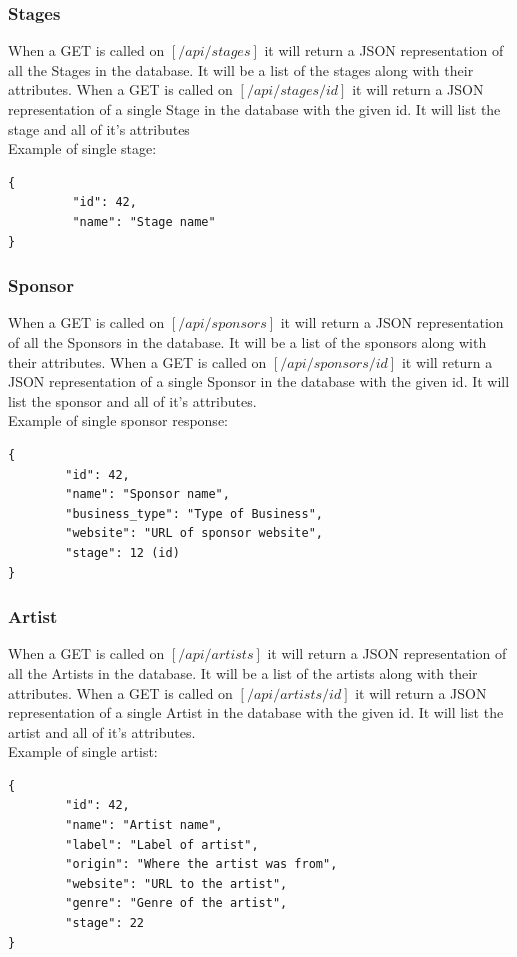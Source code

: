 \documentclass[12pt,english]{scrartcl}
\begin{document}
\subsubsection{Stages}

When a GET is called on $[/api/stages]$ it will return a JSON representation of all the Stages in the database.  It will be a list of the stages along with their attributes.
When a GET is called on $[/api/stages/{id}]$ it will return a JSON representation of a single Stage in the database with the given id.  It will list the stage and all of it's attributes
\\
Example of single stage:
\begin{verbatim}
{
         "id": 42,
         "name": "Stage name"
}
\end{verbatim}
\subsubsection{Sponsor}

When a GET is called on $[/api/sponsors]$ it will return a JSON representation of all the Sponsors in the database.  It will be a list of the sponsors along with their attributes.
When a GET is called on $[/api/sponsors/{id}]$ it will return a JSON representation of a single Sponsor in the database with the given id.  It will list the sponsor and all of it's attributes.
\\
Example of single sponsor response:
\begin{verbatim}
{
        "id": 42,
        "name": "Sponsor name",
        "business_type": "Type of Business",
        "website": "URL of sponsor website",
        "stage": 12 (id)
}
\end{verbatim}

\subsubsection{Artist}

When a GET is called on $[/api/artists]$ it will return a JSON representation of all the Artists in the database.  It will be a list of the artists along with their attributes.
When a GET is called on $[/api/artists/{id}]$ it will return a JSON representation of a single Artist in the database with the given id.  It will list the artist and all of it's attributes.
\\
Example of single artist:
\begin{verbatim}
{
        "id": 42,
        "name": "Artist name",
        "label": "Label of artist",
        "origin": "Where the artist was from",
        "website": "URL to the artist",
        "genre": "Genre of the artist",
        "stage": 22
}
\end{verbatim}
\end{document}
